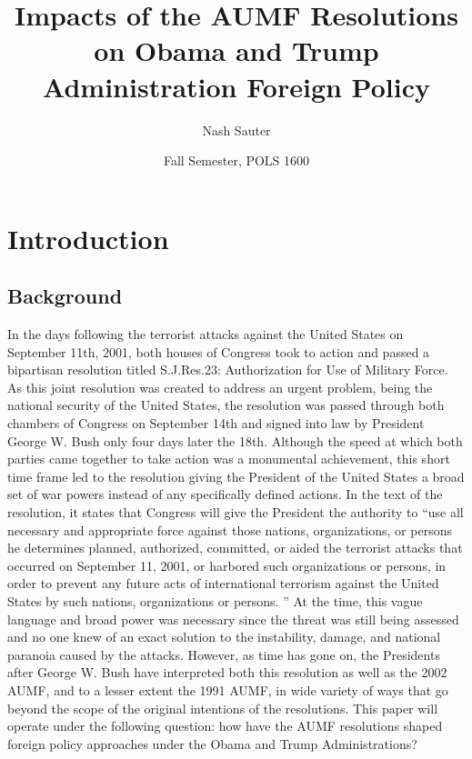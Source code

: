 \documentclass[12pt]{article}
\title{Impacts of the AUMF Resolutions on Obama and Trump Administration Foreign Policy}
\author{Nash Sauter}
\date{Fall Semester, POLS 1600}
\begin{document}
\maketitle
{}
\newpage
{}

\section*{Introduction}
\subsection*{Background}
In the days following the terrorist attacks against the United States on September 11th, 2001, both houses of Congress took to action and passed a bipartisan resolution titled S.J.Res.23: Authorization for Use of Military Force.
As this joint resolution was created to address an urgent problem, being the national security of the United States, the resolution was passed through both chambers of Congress on September 14th and signed into law by President George W. Bush only four days later the 18th.
Although the speed at which both parties came together to take action was a monumental achievement, this short time frame led to the resolution giving the President of the United States a broad set of war powers instead of any specifically defined actions.
In the text of the resolution, it states that Congress will give the President the authority to ``use all necessary and appropriate force against those nations, organizations, or persons he determines planned, authorized, committed, or aided the terrorist attacks that occurred on September 11, 2001, or harbored such organizations or persons, in order to prevent any future acts of international terrorism against the United States by such nations, organizations or persons. \autocite{daschle2001}''
At the time, this vague language and broad power was necessary since the threat was still being assessed and no one knew of an exact solution to the instability, damage, and national paranoia caused by the attacks.
However, as time has gone on, the Presidents after George W. Bush have interpreted both this resolution as well as the 2002 AUMF, and to a lesser extent the 1991 AUMF, in wide variety of ways that go beyond the scope of the original intentions of the resolutions.
This paper will operate under the following question: how have the AUMF resolutions shaped foreign policy approaches under the Obama and Trump Administrations?
\end{document}
